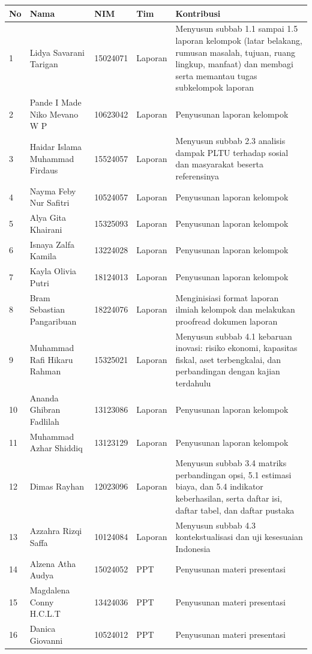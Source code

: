 \begin{longtable}{p{} p{} p{} p{} p{}}
\toprule
No & Nama & NIM & Tim & Kontribusi \\
\midrule
\endhead
1 & Lidya Savarani Tarigan & 15024071 & Laporan & Menyusun subbab 1.1 sampai 1.5 laporan kelompok (latar belakang, rumusan masalah, tujuan, ruang lingkup, manfaat) dan membagi serta memantau tugas subkelompok laporan \\
2 & Pande I Made Niko Mevano W P & 10623042 & Laporan & Penyusunan laporan kelompok \\
3 & Haidar Islama Muhammad Firdaus & 15524057 & Laporan & Menyusun subbab 2.3 analisis dampak PLTU terhadap sosial dan masyarakat beserta referensinya \\
4 & Nayma Feby Nur Safitri & 10524057 & Laporan & Penyusunan laporan kelompok \\
5 & Alya Gita Khairani & 15325093 & Laporan & Penyusunan laporan kelompok \\
6 & Isnaya Zalfa Kamila & 13224028 & Laporan & Penyusunan laporan kelompok \\
7 & Kayla Olivia Putri & 18124013 & Laporan & Penyusunan laporan kelompok \\
8 & Bram Sebastian Pangaribuan & 18224076 & Laporan & Menginisiasi format laporan ilmiah kelompok dan melakukan proofread dokumen laporan \\
9 & Muhammad Rafi Hikaru Rahman & 15325021 & Laporan & Menyusun subbab 4.1 kebaruan inovasi: risiko ekonomi, kapasitas fiskal, aset terbengkalai, dan perbandingan dengan kajian terdahulu \\
10 & Ananda Ghibran Fadlilah & 13123086 & Laporan & Penyusunan laporan kelompok \\
11 & Muhammad Azhar Shiddiq & 13123129 & Laporan & Penyusunan laporan kelompok \\
12 & Dimas Rayhan & 12023096 & Laporan & Menyusun subbab 3.4 matriks perbandingan opsi, 5.1 estimasi biaya, dan 5.4 indikator keberhasilan, serta daftar isi, daftar tabel, dan daftar pustaka \\
13 & Azzahra Rizqi Saffa & 10124084 & Laporan & Menyusun subbab 4.3 kontekstualisasi dan uji kesesuaian Indonesia \\
14 & Alzena Atha Audya & 15024052 & PPT & Penyusunan materi presentasi \\
15 & Magdalena Conny H.C.L.T & 13424036 & PPT & Penyusunan materi presentasi \\
16 & Danica Giovanni & 10524012 & PPT & Penyusunan materi presentasi \\

\end{longtable}

